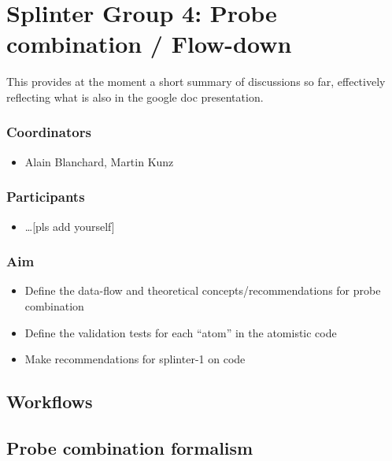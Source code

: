 
\section{Splinter Group 4: Probe combination / Flow-down}

This provides at the moment a short summary of discussions so far, effectively
reflecting what is also in the google doc presentation.

\subsubsection*{Coordinators}
\begin{itemize}
 \item Alain Blanchard, Martin Kunz
\end{itemize}
\subsubsection*{Participants}
\begin{itemize}
 \item \ldots [pls add yourself]
\end{itemize}

\subsubsection*{Aim}

\begin{itemize}
\item Define the data-flow and theoretical concepts/recommendations for probe combination
\item Define the validation tests for each “atom” in the atomistic code
\item Make recommendations for splinter-1 on code 
\end{itemize}



\subsection{Workflows}


\subsection{Probe combination formalism}


